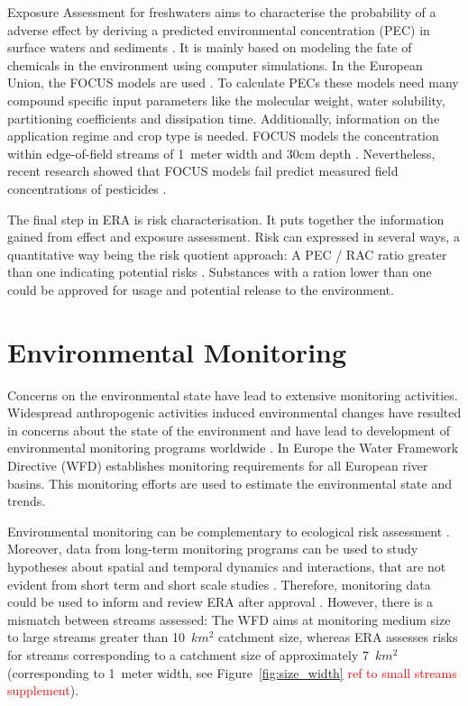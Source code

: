 Exposure Assessment for freshwaters aims to characterise the probability of a adverse effect by deriving a predicted environmental concentration (PEC) in surface waters and sediments \citep{newman_fundamentals_2015}. 
It is mainly based on modeling the fate of chemicals in the environment using computer simulations. 
In the European Union, the FOCUS models are used \citep{focus_focus_2001, efsa_guidance_2013}.
To calculate PECs these models need many compound specific input parameters like the molecular weight, water solubility, partitioning coefficients and dissipation time. 
Additionally, information on the application regime and crop type is needed. 
FOCUS models the concentration within edge-of-field streams of 1~meter width and 30cm depth \citep{erlacher_regulation_2011}. 
Nevertheless, recent research showed that FOCUS models fail predict measured field concentrations of pesticides \citep{knabel_regulatory_2012, knabel_fungicide_2014}. 

The final step in ERA is risk characterisation.
It puts together the information gained from effect and exposure assessment. 
Risk can expressed in several ways, a quantitative way being the risk quotient approach: A PEC / RAC ratio greater than one indicating potential risks \citep{efsa_guidance_2013, suter_ecological_2007, amiard-triquet_aquatic_2015}. 
Substances with a ration lower than one could be approved for usage and potential release to the environment.



\section{Environmental Monitoring}

Concerns on the environmental state have lead to extensive monitoring activities. 
Widespread anthropogenic activities induced environmental changes have resulted in concerns about the state of the environment and have lead to development of environmental monitoring programs worldwide \citep{nichols_monitoring_2006}. 
In Europe the Water Framework Directive (WFD) \citep{european_union_directive_2000} establishes monitoring requirements for all European river basins. 
This monitoring efforts are used to estimate the environmental state and trends. 

Environmental monitoring can be complementary to ecological risk assessment \citep{suter_ecological_2007}.
Moreover, data from long-term monitoring programs can be used to study hypotheses about spatial and temporal dynamics and interactions, that are not evident from short term and short scale studies \citep{gitzen_design_2012}.
Therefore, monitoring data could be used to inform and review ERA after approval \citep{knauer_pesticides_2016}. 
However, there is a mismatch between streams assessed: The WFD aims at monitoring medium size to large streams greater than 10~$km^2$ catchment size, whereas ERA assesses risks for streams corresponding to a catchment size of approximately 7~$km^2$ (corresponding to 1~meter width, see Figure~\ref{fig:size_width} \textcolor{red}{ref to small streams supplement}). 



